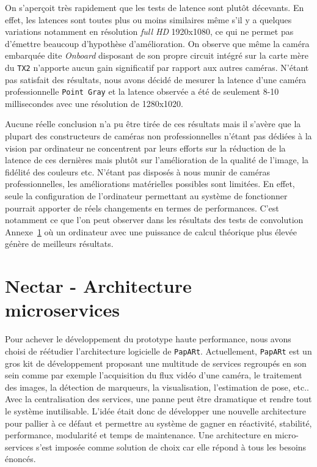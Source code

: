 On s'aperçoit très rapidement que les tests de latence sont plutôt décevants. En effet, les latences sont toutes plus ou moins similaires même s'il y a quelques variations notamment en résolution \emph{full HD} 1920x1080, ce qui ne permet pas d'émettre beaucoup d'hypothèse d'amélioration. On observe que même la caméra embarquée dite \emph{Onboard} disposant de son propre circuit intégré sur la carte mère du \texttt{TX2} n'apporte aucun gain significatif par rapport aux autres caméras.
N'étant pas satisfait des résultats, nous avons décidé de mesurer la latence d'une caméra professionnelle \texttt{Point Gray} et la latence observée a été de seulement 8-10 millisecondes avec une résolution de 1280x1020. 

Aucune réelle conclusion n'a pu être tirée de ces résultats mais il s'avère que la plupart des constructeurs de caméras non professionnelles n'étant pas dédiées à la vision par ordinateur ne concentrent par leurs efforts sur la réduction de la latence de ces dernières mais plutôt sur l'amélioration de la qualité de l'image, la fidélité des couleurs etc. N'étant pas disposés à nous munir de caméras professionnelles, les améliorations matérielles possibles sont limitées. En effet, seule la configuration de l'ordinateur permettant au système de fonctionner pourrait apporter de réels changements en termes de performances. C'est notamment ce que l'on peut observer dans les résultats des tests de convolution Annexe~\hyperref[annexe:bench]{1} où un ordinateur avec une puissance de calcul théorique plus élevée génère de meilleurs résultats.

\newpage
\section{Nectar - Architecture microservices}
\label{sec:nectararchi}

Pour achever le développement du prototype haute performance, nous avons choisi de réétudier l'architecture logicielle de \texttt{PapARt}. 
Actuellement, \texttt{PapARt} est un gros kit de développement proposant une multitude de services regroupés en son sein comme par exemple l'acquisition du flux vidéo d'une caméra, le traitement des images, la détection de marqueurs, la visualisation, l'estimation de pose, etc.. Avec la centralisation des services, une panne peut être dramatique et rendre tout le système inutilisable. L'idée était donc de développer une nouvelle architecture pour pallier à ce défaut et permettre au système de gagner en réactivité, stabilité, performance, modularité et temps de maintenance. Une architecture en micro-services s'est imposée comme solution de choix car elle répond à tous les besoins énoncés.

